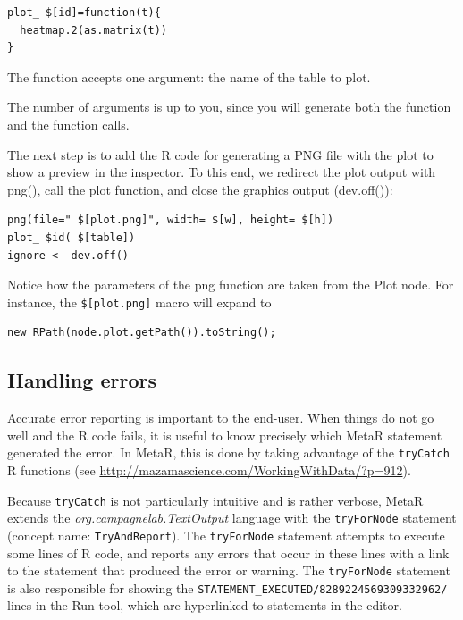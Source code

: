 \begin{lstlisting}
plot_ $[id]=function(t){                        
  heatmap.2(as.matrix(t)) 
}                                             
\end{lstlisting}

The function accepts one argument: the name of the table to plot. 

\begin{remark}
The number of arguments is up to you, since you will generate both the function and the function calls.

\end{remark}

The next step is to add the R code for generating a PNG file with the plot to show a preview in the inspector. To this end, we redirect the plot output with png(), call the plot function, and close the graphics output (dev.off()):

\begin{lstlisting}
png(file=" $[plot.png]", width= $[w], height= $[h])
plot_ $id( $[table])                           
ignore <- dev.off()                          
\end{lstlisting}
Notice how the parameters of the png function are taken from the Plot node.
For instance, the \texttt{\$[plot.png]} macro will expand to 

\begin{lstlisting}
new RPath(node.plot.getPath()).toString();
\end{lstlisting}


\subsection{Handling errors}
Accurate error reporting is important to the end-user. When things do not go well and the R code fails, it is useful to know precisely which MetaR statement generated the error. In MetaR, this is done by taking advantage of the \texttt{tryCatch} R functions (see \url{http://mazamascience.com/WorkingWithData/?p=912}). 

Because \texttt{tryCatch} is not particularly intuitive and is rather verbose, MetaR extends the \textit{org.campagnelab.TextOutput} language with the \texttt{tryForNode} statement (concept name: \texttt{TryAndReport}). The \texttt{tryForNode} statement attempts to execute some lines of R code, and reports any errors that occur in these lines with a link to the statement that produced the error or warning. The \texttt{tryForNode} statement is also responsible for showing the \texttt{STATEMENT\_EXECUTED/\allowbreak{}8289224\allowbreak{}569309332962/} lines in the Run tool, which are hyperlinked to statements in the editor. 

